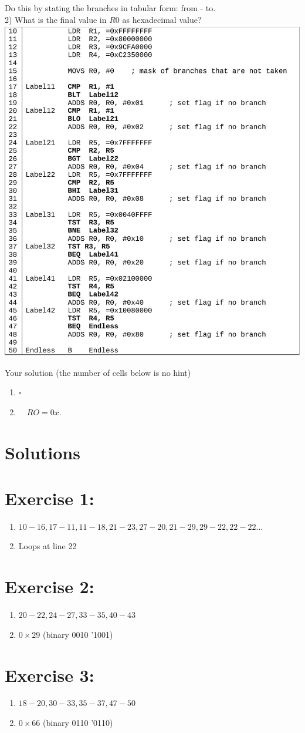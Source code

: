\documentclass[10pt]{article}
\begin{document}
Do this by stating the branches in tabular form: from - to.\\
2) What is the final value in $R 0$ as hexadecimal value?\\
\includegraphics[width=\linewidth]{images/2025_01_02_9902c2d2685de638ef73g-4}

Your solution (the number of cells below is no hint)

\begin{enumerate}
  \item $\square$
  \item $\quad R O=0 x$. $\qquad$
\end{enumerate}

\section*{Solutions}
\section*{Exercise 1:}
\begin{enumerate}
  \item $10-16,17-11,11-18,21-23,27-20,21-29,29-22,22-22 \ldots$
  \item Loops at line 22
\end{enumerate}

\section*{Exercise 2:}
\begin{enumerate}
  \item $20-22,24-27,33-35,40-43$
  \item $0 \times 29$ (binary 0010 '1001)
\end{enumerate}

\section*{Exercise 3:}
\begin{enumerate}
  \item $18-20,30-33,35-37,47-50$
  \item $0 \times 66$ (binary 0110 '0110)
\end{enumerate}
\end{document}
